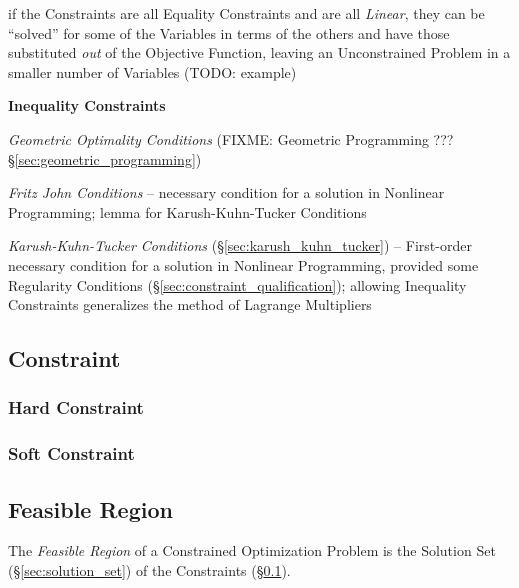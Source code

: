 if the Constraints are all Equality Constraints and are all \emph{Linear}, they
can be ``solved'' for some of the Variables in terms of the others and have
those substituted \emph{out} of the Objective Function, leaving an
Unconstrained Problem in a smaller number of Variables (TODO: example)


\textbf{Inequality Constraints}

\emph{Geometric Optimality Conditions} (FIXME: Geometric Programming ???
\S\ref{sec:geometric_programming})

\emph{Fritz John Conditions} -- necessary condition for a solution in Nonlinear
Programming; lemma for Karush-Kuhn-Tucker Conditions

\emph{Karush-Kuhn-Tucker Conditions} (\S\ref{sec:karush_kuhn_tucker}) --
First-order necessary condition for a solution in Nonlinear Programming,
provided some Regularity Conditions (\S\ref{sec:constraint_qualification});
allowing Inequality Constraints generalizes the method of Lagrange Multipliers



\subsection{Constraint}\label{sec:constraint}

\subsubsection{Hard Constraint}\label{sec:hard_constraint}

\subsubsection{Soft Constraint}\label{sec:soft_constraint}



\subsection{Feasible Region}\label{sec:feasible_region}

The \emph{Feasible Region} of a Constrained Optimization Problem is the
Solution Set (\S\ref{sec:solution_set}) of the Constraints
(\S\ref{sec:constraint}).



